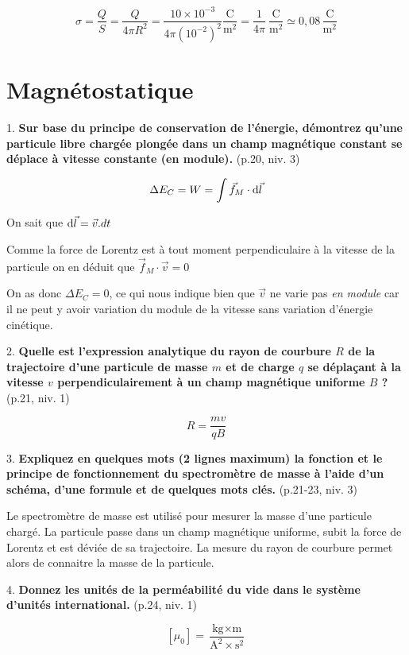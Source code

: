 \documentclass	[11pt, a4paper, openany]{book}
\begin{document}
		$$ \sigma = \dfrac{Q}{S} = \dfrac{Q}{4\pi R^2} = \dfrac{10\times 10^{-3}}{4\pi (10^{-2})^2} \dfrac{\mathrm{C}}{\mathrm{m}^2} = \dfrac{1}{4\pi}\ \dfrac{\mathrm{C}}{\mathrm{m}^2} \simeq 0,08\,\dfrac{\mathrm{C}}{\mathrm{m}^2}$$
		
		\vspace{0,5cm}
				
				
		\newpage
		\renewcommand{\quest}[4]{#1. \textbf{#4} (p.#2, niv. #3)}
		\section{Magnétostatique}
		
		\quest{1}{20}{3}{Sur base du principe de conservation de l’énergie, démontrez qu’une particule libre chargée plongée dans un champ magnétique constant se déplace à vitesse constante (en module).}
		
		$$\Delta E_C = W = \int \vec f_M \cdot {\rm d}\vec l$$
		
		On sait que ${\rm d}\vec l = \vec v . dt$
		
		Comme la force de Lorentz est à tout moment perpendiculaire à la vitesse de la particule on en déduit que $\vec f_M \cdot \vec v = 0$
		
		On as donc $\Delta E_C = 0$, ce qui nous indique bien que $\vec v$ ne varie pas \emph{en module} car il ne peut y avoir variation du module de la vitesse sans variation d'énergie cinétique.
		
		\quest{2}{21}{1}{Quelle est l’expression analytique du rayon de courbure $R$ de la trajectoire d’une particule de masse $m$ et de charge $q$ se déplaçant à la vitesse $v$ perpendiculairement à un champ magnétique uniforme $B$ ?}
		
		$$ R = \dfrac{mv}{qB}$$
		
		\quest{3}{21-23}{3}{Expliquez en quelques mots (2 lignes maximum) la fonction et le principe de fonctionnement du spectromètre de masse à l’aide d’un schéma, d’une formule et de quelques mots clés.}
		
		Le spectromètre de masse est utilisé pour mesurer la masse d'une particule chargé. La particule passe dans un champ magnétique uniforme, subit la force de Lorentz et est déviée de sa trajectoire. La mesure du rayon de courbure permet alors de connaitre la masse de la particule.
		
		\quest{4}{24}{1}{Donnez les unités de la perméabilité du vide dans le système d’unités international.}
		
		$$ [\mu_0] = \dfrac{\text{kg}\times \text{m}}{\text{A}^2\times \text{s}^2}  $$
		
\end{document}
